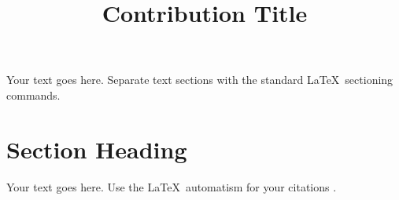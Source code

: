 %
%
%
%









%

\title*{Contribution Title}


\maketitle

Your text goes here. Separate text sections with the standard \LaTeX\
sectioning commands.

\section{Section Heading}
\label{sec:1}
Your text goes here. Use the \LaTeX\ automatism for your citations
\cite{monograph}.


